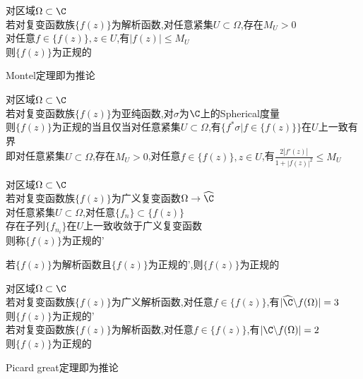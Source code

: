 \begin{dingli}
对区域$\Omega\subset \C$\\
若对复变函数族$\{f(z)\}$为解析函数,对任意紧集$U\subset\Omega$,存在$M_{U}>0$\\
对任意$f\in\{f(z)\},z\in U$,有$|f(z)|\leq M_{U}$\\
则$\{f(z)\}$为正规的
\end{dingli}

\begin{zhu}
Montel定理即为推论
\end{zhu}

\begin{dingli}
对区域$\Omega\subset \C$\\
若对复变函数族$\{f(z)\}$为亚纯函数,对$\sigma$为$\C$上的Spherical度量\\
则$\{f(z)\}$为正规的当且仅当对任意紧集$U\subset\Omega$,有$\{f^*\sigma|f\in\{f(z)\}\}$在$U$上一致有界\\
即对任意紧集$U\subset\Omega$,存在$M_{U}>0$,对任意$f\in\{f(z)\},z\in U$,有$\frac{2|f'(z)|}{1+|f(z)|^2}\leq M_{U}$
\end{dingli}

\begin{dingyi}
对区域$\Omega\subset \C$\\
若对复变函数族$\{f(z)\}$为广义复变函数$\Omega\to\widehat{\C}$\\
对任意紧集$U\subset\Omega$,对任意$\{f_n\}\subset\{f(z)\}$\\
存在子列$\{f_{n_i}\}$在$U$上一致收敛于广义复变函数\\
则称$\{f(z)\}$为正规的'
\end{dingyi}

\begin{zhu}
若$\{f(z)\}$为解析函数且$\{f(z)\}$为正规的',则$\{f(z)\}$为正规的
\end{zhu}

\begin{dingli}
对区域$\Omega\subset \C$\\
若对复变函数族$\{f(z)\}$为广义解析函数,对任意$f\in\{f(z)\}$,有$|\widehat{\C}\backslash f(\Omega)|=3$\\
则$\{f(z)\}$为正规的'\\
若对复变函数族$\{f(z)\}$为解析函数,对任意$f\in\{f(z)\}$,有$|\C\backslash f(\Omega)|=2$\\
则$\{f(z)\}$为正规的
\end{dingli}

\begin{zhu}
Picard great定理即为推论
\end{zhu}

